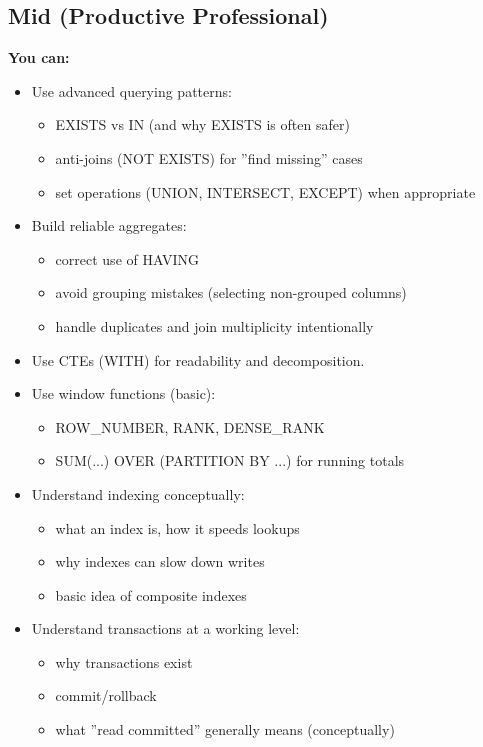 \subsection{Mid (Productive Professional)}
\textbf{You can:}
\begin{itemize}
    \item Use advanced querying patterns:
    \begin{itemize}
        \item EXISTS vs IN (and why EXISTS is often safer)
        \item anti-joins (NOT EXISTS) for ''find missing'' cases
        \item set operations (UNION, INTERSECT, EXCEPT) when appropriate
    \end{itemize}
    \item Build reliable aggregates:
    \begin{itemize}
        \item correct use of HAVING
        \item avoid grouping mistakes (selecting non-grouped columns)
        \item handle duplicates and join multiplicity intentionally
    \end{itemize}
    \item Use CTEs (WITH) for readability and decomposition.
    \newpage
    \item Use window functions (basic):
    \begin{itemize}
        \item ROW\_NUMBER, RANK, DENSE\_RANK
        \item SUM(...) OVER (PARTITION BY ...) for running totals
    \end{itemize}
    \item Understand indexing conceptually:
    \begin{itemize}
        \item what an index is, how it speeds lookups
        \item why indexes can slow down writes
        \item basic idea of composite indexes
    \end{itemize}
    \item Understand transactions at a working level:
    \begin{itemize}
        \item why transactions exist
        \item commit/rollback
        \item what ''read committed'' generally means (conceptually)
    \end{itemize}
\end{itemize}

